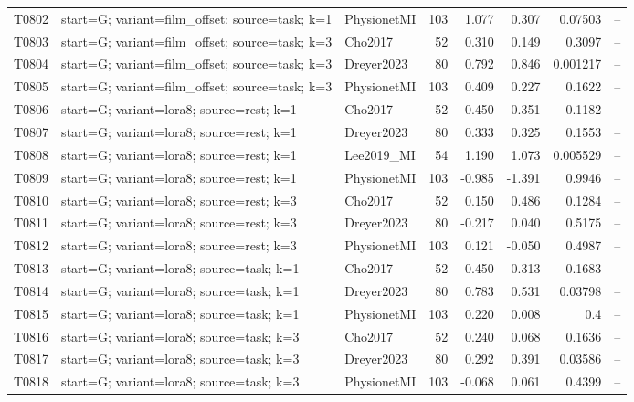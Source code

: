 \begin{longtable}{p{.45in}p{2.6in}p{.75in}rrrrr}
T0802 & start=G; variant=film\_\allowbreak{}offset; source=task; k=1 & PhysionetMI & 103 & 1.077 & 0.307 & 0.07503 & -- \\
T0803 & start=G; variant=film\_\allowbreak{}offset; source=task; k=3 & Cho2017 & 52 & 0.310 & 0.149 & 0.3097 & -- \\
T0804 & start=G; variant=film\_\allowbreak{}offset; source=task; k=3 & Dreyer2023 & 80 & 0.792 & 0.846 & 0.001217 & -- \\
T0805 & start=G; variant=film\_\allowbreak{}offset; source=task; k=3 & PhysionetMI & 103 & 0.409 & 0.227 & 0.1622 & -- \\
T0806 & start=G; variant=lora8; source=rest; k=1 & Cho2017 & 52 & 0.450 & 0.351 & 0.1182 & -- \\
T0807 & start=G; variant=lora8; source=rest; k=1 & Dreyer2023 & 80 & 0.333 & 0.325 & 0.1553 & -- \\
T0808 & start=G; variant=lora8; source=rest; k=1 & Lee2019\_\allowbreak{}MI & 54 & 1.190 & 1.073 & 0.005529 & -- \\
T0809 & start=G; variant=lora8; source=rest; k=1 & PhysionetMI & 103 & -0.985 & -1.391 & 0.9946 & -- \\
T0810 & start=G; variant=lora8; source=rest; k=3 & Cho2017 & 52 & 0.150 & 0.486 & 0.1284 & -- \\
T0811 & start=G; variant=lora8; source=rest; k=3 & Dreyer2023 & 80 & -0.217 & 0.040 & 0.5175 & -- \\
T0812 & start=G; variant=lora8; source=rest; k=3 & PhysionetMI & 103 & 0.121 & -0.050 & 0.4987 & -- \\
T0813 & start=G; variant=lora8; source=task; k=1 & Cho2017 & 52 & 0.450 & 0.313 & 0.1683 & -- \\
T0814 & start=G; variant=lora8; source=task; k=1 & Dreyer2023 & 80 & 0.783 & 0.531 & 0.03798 & -- \\
T0815 & start=G; variant=lora8; source=task; k=1 & PhysionetMI & 103 & 0.220 & 0.008 & 0.4 & -- \\
T0816 & start=G; variant=lora8; source=task; k=3 & Cho2017 & 52 & 0.240 & 0.068 & 0.1636 & -- \\
T0817 & start=G; variant=lora8; source=task; k=3 & Dreyer2023 & 80 & 0.292 & 0.391 & 0.03586 & -- \\
T0818 & start=G; variant=lora8; source=task; k=3 & PhysionetMI & 103 & -0.068 & 0.061 & 0.4399 & -- \\
\bottomrule
\end{longtable}
